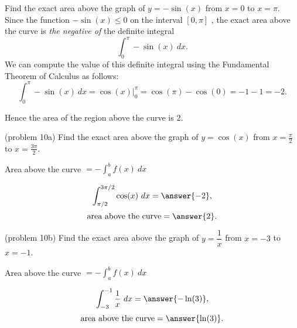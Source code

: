 \documentclass[handout]{ximera}
\begin{document}
\begin{example}[example 10]
Find the exact area above the graph of $y = -\sin(x)$ from $x = 0$ to $x = \pi$. \\
Since the function $-\sin(x) \leq 0$ on the interval $[0, \pi]$ , the exact area above the curve is \textit{the negative of} the definite integral 
\[\int_{0}^\pi -\sin(x) \ dx.\]
We can compute the value of this definite integral using the Fundamental Theorem of Calculus as follows:
\[\int_0^\pi -\sin(x) \ dx = \cos(x) \Big|_{0}^\pi = \cos(\pi) - \cos(0) = -1 -1 = -2.\]

Hence the area of the region above the curve is $2$.


\begin{image}
\end{image}
\end{example}



\begin{problem}(problem 10a)
Find the exact area above the graph of $y = \cos(x)$ from $x = \frac{\pi}{2}$ to $x = \frac{3\pi}{2}$. \\
\begin{hint}
Area above the curve $= -\int_a^b f(x) \ dx$
\end{hint}
\[\int_{\pi/2}^{3\pi/2} \cos(x) \ dx = \answer{-2},\]
\[\text{area above the curve} = \answer{2}.\]
\end{problem}


\begin{problem}(problem 10b)
Find the exact area above the graph of $y = \dfrac{1}{x}$ from $x = -3$ to $x = -1$. \\
\begin{hint}
Area above the curve $= -\int_a^b f(x) \ dx$
\end{hint}
\[\int_{-3}^{-1} \frac{1}{x} \ dx = \answer{-\ln(3)},\]
\[\text{area above the curve} = \answer{\ln(3)}.\]
\end{problem}
\end{document}
